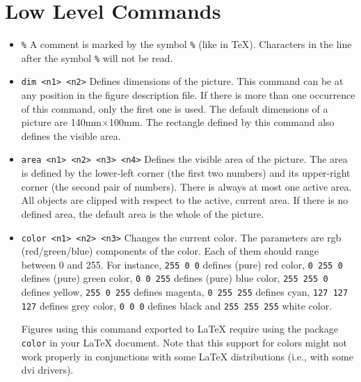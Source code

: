 \documentclass[a4paper]{book}
\begin{document}
\section{Low Level Commands}

\begin{itemize}
\item \verb|%|
        A comment is marked by the symbol \verb|%| (like in
        \TeX). Characters in the line after the symbol \verb|%| will not
        be read.

\item \verb|dim <n1> <n2>|
        Defines dimensions of the picture. This command can be
        at any position in the figure description file. If there
        is more than one occurrence of this command, only the first
        one is used. The default dimensions of a picture are
        140mm$\times$100mm. The rectangle defined by this command
        also defines the visible area.

\item \verb|area <n1> <n2> <n3> <n4>|
        Defines the visible area of the picture. The area is defined
        by the lower-left corner (the first two numbers) and its
        upper-right corner (the second pair of numbers). There is
        always at most one active area. All objects are clipped with
        respect to the active, current area. If there is no defined
        area, the default area is the whole of the picture.

\item \verb|color <n1> <n2> <n3>|
        Changes the current color. The parameters are {\sc rgb}
        (red/green/blue) components of the color. Each of them
        should range between 0 and 255.
        For instance, \verb|255 0 0| defines (pure) red color,
        \verb|0 255 0| defines (pure) green color,
        \verb|0 0 255| defines (pure) blue color,
        \verb|255 255 0| defines yellow,
        \verb|255 0 255| defines magenta,
        \verb|0 255 255| defines cyan,
        \verb|127 127 127| defines grey color,
        \verb|0 0 0| defines black and
        \verb|255 255 255| white color.

        Figures using this command exported to \LaTeX{} require using
        the package \verb|color| in your \LaTeX{} document.
        Note that this support for colors might not work properly
        in conjunctions with some \LaTeX{} distributions (i.e., with
        some {\sc dvi} drivers).


\end{itemize}
\end{document}

